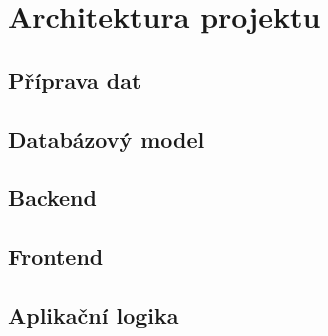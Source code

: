 
\chapter{Architektura projektu}


\section{Příprava dat}


\section{Databázový model}


\section{Backend}


\section{Frontend}


\section{Aplikační logika}